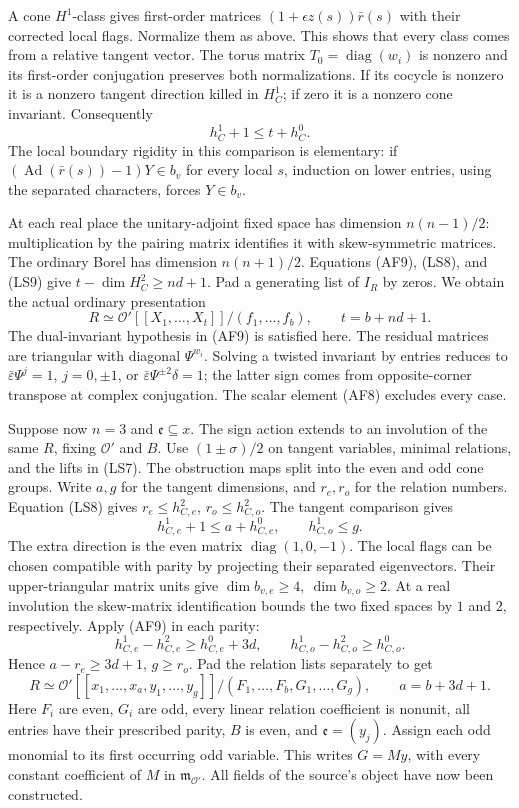 A cone \(H^1\)-class gives first-order matrices
\((1+\epsilon z(s))\bar r(s)\) with their
corrected local flags.
Normalize them as above.
This shows that every class comes from a
relative tangent vector.
The torus matrix \(T_0=\operatorname{diag}(w_i)\)
is nonzero and its first-order conjugation
preserves both normalizations.
If its cocycle is nonzero it is a nonzero
tangent direction killed in \(H_C^1\);
if zero it is a nonzero cone invariant.
Consequently
\[
                    h_C^1+1\le t+h_C^0 .                     \tag{LS9}
\]
The local boundary rigidity in this comparison
is elementary: if
\((\operatorname{Ad}(\bar r(s))-1)Y\in b_v\)
for every local \(s\), induction on lower
entries, using the separated characters,
forces \(Y\in b_v\).

At each real place the unitary-adjoint fixed
space has dimension \(n(n-1)/2\):
multiplication by the pairing matrix identifies
it with skew-symmetric matrices.
The ordinary Borel has dimension \(n(n+1)/2\).
Equations (AF9), (LS8), and (LS9) give
\(t-\dim H_C^2\ge nd+1\).
Pad a generating list of \(I_R\) by zeros.
We obtain the actual ordinary presentation
\[
 R\simeq\mathcal O'[[X_1,\ldots,X_t]]/(f_1,\ldots,f_b),
                         \qquad t=b+nd+1 .                   \tag{LS10}
\]
The dual-invariant hypothesis in (AF9) is
satisfied here.
The residual matrices are triangular with
diagonal \(\Psi^{w_i}\).
Solving a twisted invariant by entries reduces
to \(\bar\varepsilon\Psi^j=1\), \(j=0,\pm1\),
or \(\bar\varepsilon\Psi^{\pm2}\delta=1\);
the latter sign comes from opposite-corner
transpose at complex conjugation.
The scalar element (AF8) excludes every case.

Suppose now \(n=3\) and \(\mathfrak e\subseteq x\).
The sign action extends to an involution of
the same \(R\), fixing \(\mathcal O'\) and \(B\).
Use \((1\pm\sigma)/2\) on tangent variables,
minimal relations, and the lifts in (LS7).
The obstruction maps split into the even and
odd cone groups.
Write \(a,g\) for the tangent dimensions,
and \(r_e,r_o\) for the relation numbers.
Equation (LS8) gives \(r_e\le h_{C,e}^2\),
\(r_o\le h_{C,o}^2\).
The tangent comparison gives
\[
 h_{C,e}^1+1\le a+h_{C,e}^0,\qquad h_{C,o}^1\le g .
\]
The extra direction is the even matrix
\(\operatorname{diag}(1,0,-1)\).
The local flags can be chosen compatible
with parity by projecting their separated
eigenvectors.
Their upper-triangular matrix units give
\(\dim b_{v,e}\ge4,\ \dim b_{v,o}\ge2\).
At a real involution the skew-matrix
identification bounds the two fixed spaces
by \(1\) and \(2\), respectively.
Apply (AF9) in each parity:
\[
 h_{C,e}^1-h_{C,e}^2\ge h_{C,e}^0+3d,\qquad
 h_{C,o}^1-h_{C,o}^2\ge h_{C,o}^0 .
\]
Hence \(a-r_e\ge3d+1\), \(g\ge r_o\).
Pad the relation lists separately to get
\[
 R\simeq
 \mathcal O'[[x_1,\ldots,x_a,y_1,\ldots,y_g]]
   /(F_1,\ldots,F_b,G_1,\ldots,G_g),\qquad a=b+3d+1 .           \tag{LS11}
\]
Here \(F_i\) are even, \(G_i\) are odd, every
linear relation coefficient is nonunit,
all entries have their prescribed parity,
\(B\) is even, and \(\mathfrak e=(y_j)\).
Assign each odd monomial to its first
occurring odd variable.
This writes \(G=My\), with every constant
coefficient of \(M\) in
\(\mathfrak m_{\mathcal O'}\).
All fields of the source's 
object have now been constructed.

